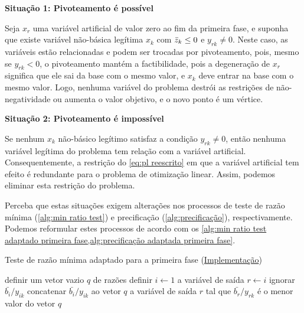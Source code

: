 \textbf{Situação 1: Pivoteamento é possível}

Seja $x_{r}$ uma variável artificial de valor zero ao fim da primeira fase, e suponha que existe variável não-básica legítima $x_{k}$ com $\bar{z}_{k} \leq 0$ e $ y_{rk} \neq 0$. Neste caso, as variáveis estão relacionadas e podem ser trocadas por pivoteamento, pois, mesmo se $ y_{rk} < 0$, o pivoteamento mantém a factibilidade, pois a degeneração de $x_{r}$ significa que ele sai da base com o mesmo valor, e $x_{k}$ deve entrar na base com o mesmo valor. Logo, nenhuma variável do problema destrói as restrições de não-negatividade ou aumenta o valor objetivo, e o novo ponto é um vértice.

\textbf{Situação 2: Pivoteamento é impossível}

Se nenhum $x_{k}$ não-básico legítimo satisfaz a condição $ y_{rk} \neq 0$, então nenhuma variável legítima do problema tem relação com a variável artificial. Consequentemente, a restrição do \cref{eq:pl reescrito} em que a variável artificial tem efeito é redundante para o problema de otimização linear. Assim, podemos eliminar esta restrição do problema.

Perceba que estas situações exigem alterações nos processos de teste de razão mínima (\cref{alg:min ratio test}) e precificação (\cref{alg:precificação}), respectivamente. Podemos reformular estes processos de acordo com os \cref{alg:min ratio test adaptado primeira fase,alg:precificação adaptada primeira fase}.

\begin{algorithm}
\begin{algorithmic}[1]
    \caption{Teste de razão mínima adaptado para a primeira fase (\href{https://github.com/phcentenaro7/Caique.jl/blob/9c78027f1884181846a6321a5640f92c9a718ce4/src/Simplex.jl\#L153}{Implementação})}\label{alg:min ratio test adaptado primeira fase}
    \def\yik{y_{ik}}
    \def\bi{\bar{ b_i}}
    \def\yrk{y_{rk}}
    \def\br{\bar{b_r}}
    \def\ratio{\bi/\yik}
    \def\minratio{\br/\yrk}
    \State definir um vetor vazio $ q$ de razões
    \State definir $i \gets 1$
            \State \Return a variável de saída $r \gets i$
        \ElsIf{$\yik \leq 0$}
            \State ignorar $\ratio$
        \Else
            \State concatenar $\ratio$ ao vetor $ q$
        \EndIf
    \EndWhile
    \State \Return a variável de saída $r$ tal que $\minratio$ é o menor valor do vetor $ q$
\end{algorithmic}
\end{algorithm}

